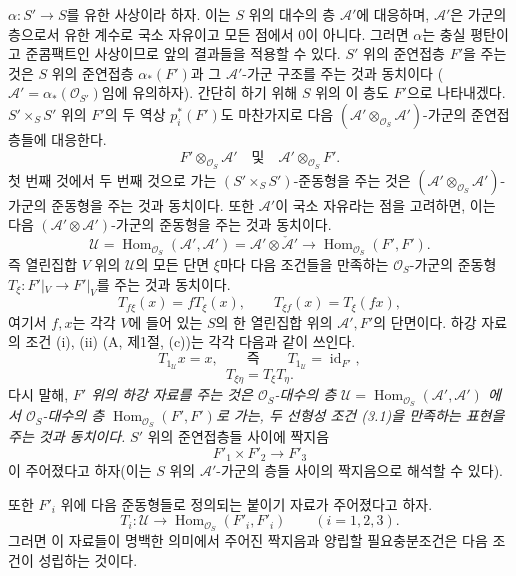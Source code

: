 \documentclass[11pt,twoside,openany]{book}
\numberwithin{equation}{section}
\newcommand{\sourceunit}{front}
\newcommand{\src}[1]{%
  \phantomsection\hypertarget{src:\sourceunit:#1}{}%
  \marginpar{\raggedleft\footnotesize\sffamily #1}%
}
\theoremstyle{plain}
\theoremstyle{definition}
\theoremstyle{remark}
\begin{document}
$\alpha:S'\longrightarrow S$를 유한 사상이라 하자. 이는 $S$ 위의
대수의 층 $\mathcal A'$에 대응하며, $\mathcal A'$은 가군의 층으로서
유한 계수로 국소 자유이고 모든 점에서 $0$이 아니다. 그러면
$\alpha$는 충실 평탄이고 준콤팩트인 사상이므로 앞의 결과들을 적용할
수 있다. $S'$ 위의 준연접층 $F'$을 주는 것은 $S$ 위의 준연접층
$\alpha_*(F')$과 그 $\mathcal A'$-가군 구조를 주는 것과 동치이다
($\mathcal A'=\alpha_*(\mathcal O_{S'})$임에 유의하자). 간단히 하기
위해 $S$ 위의 이 층도 $F'$으로 나타내겠다. $S'\times_SS'$ 위의
$F'$의 두 역상 $p_i^*(F')$도 마찬가지로 다음
$(\mathcal A'\otimes_{\mathcal O_S}\mathcal A')$-가군의 준연접층들에
대응한다.
\[
  F'\otimes_{\mathcal O_S}\mathcal A'
  \quad\text{및}\quad
  \mathcal A'\otimes_{\mathcal O_S}F'.
\]
첫 번째 것에서 두 번째 것으로 가는
$(S'\times_SS')$-준동형을 주는 것은
$(\mathcal A'\otimes_{\mathcal O_S}\mathcal A')$-가군의 준동형을
주는 것과 동치이다. 또한 $\mathcal A'$이 국소 자유라는 점을
고려하면, 이는 다음 $(\mathcal A'\otimes\mathcal A')$-가군의
준동형을 주는 것과 동치이다.
\[
  \mathcal U=
  \operatorname{Hom}_{\mathcal O_S}(\mathcal A',\mathcal A')
  =\mathcal A'\otimes\check{\mathcal A}'
  \longrightarrow
  \operatorname{Hom}_{\mathcal O_S}(F',F').
\]
즉 열린집합 $V$ 위의 $\mathcal U$의 모든 단면 $\xi$마다 다음
조건들을 만족하는 $\mathcal O_S$-가군의 준동형
$T_\xi:F'|_V\longrightarrow F'|_V$를 주는 것과 동치이다.
\begin{equation}
  T_{f\xi}(x)=fT_\xi(x),
  \qquad T_{\xi f}(x)=T_\xi(fx),
  \tag{3.1}
\end{equation}
여기서 $f,x$는 각각 $V$에 들어 있는 $S$의 한 열린집합 위의
$\mathcal A',F'$의 단면이다. 하강 자료의 조건 (i), (ii)
(A, 제1절, (c))는 각각 다음과 같이 쓰인다.
\begin{equation}
  T_{1_{\mathcal U}}x=x,
  \qquad\text{즉}\qquad
  T_{1_{\mathcal U}}=\operatorname{id}_{F'},
  \tag{3.2}
\end{equation}
\begin{equation}
  T_{\xi\eta}=T_\xi T_\eta.
  \tag{3.3}
\end{equation}
다시 말해, \emph{$F'$ 위의 하강 자료를 주는 것은
$\mathcal O_S$-대수의 층
$\mathcal U=\operatorname{Hom}_{\mathcal O_S}(\mathcal A',\mathcal A')$
에서 $\mathcal O_S$-대수의 층
$\operatorname{Hom}_{\mathcal O_S}(F',F')$로 가는, 두 선형성 조건
(3.1)을 만족하는 표현을 주는 것과 동치이다.} $S'$ 위의 준연접층들
사이에 짝지음
\[
  F'_1\times F'_2\longrightarrow F'_3
\]
이 주어졌다고 하자(이는 $S$ 위의 $\mathcal A'$-가군의 층들 사이의
짝지음으로 해석할 수 있다).

\src{320}
또한 $F'_i$ 위에 다음 준동형들로 정의되는 붙이기 자료가 주어졌다고
하자.
\[
  T_i:\mathcal U\longrightarrow
  \operatorname{Hom}_{\mathcal O_S}(F'_i,F'_i)
  \qquad (i=1,2,3).
\]
그러면 이 자료들이 명백한 의미에서 주어진 짝지음과 양립할
필요충분조건은 다음 조건이 성립하는 것이다.
\end{document}
